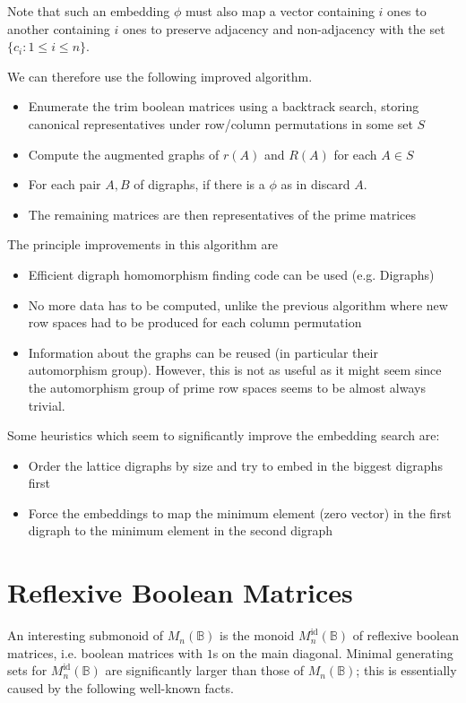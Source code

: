 \documentclass[11pt]{article}
\numberwithin{equation}{section}
\newcommand{\B}{\mathbb{B}}
\newcommand{\Bn}{M_n(\B)}
\newcommand{\Refn}{M_n^{\text{id}}(\B)}
\begin{document}
Note that such an embedding $\phi$ must also map a vector containing $i$ ones to another containing $i$ ones to preserve adjacency and non-adjacency with the set $\{ c_i : 1 \leq i \leq n \}$.

We can therefore use the following improved algorithm.
\begin{itemize}
  \item
    Enumerate the trim boolean matrices using a backtrack search, storing 
    canonical representatives under row/column permutations in some set $S$
  \item 
    Compute the augmented graphs of $r(A)$ and $R(A)$ for each $A \in S$
  \item 
    For each pair $A, B$ of digraphs, if there is a $\phi$ as in  discard $A$.
  \item
    The remaining matrices are then representatives of the prime matrices
\end{itemize}

The principle improvements in this algorithm are
\begin{itemize}
  \item 
    Efficient digraph homomorphism finding code can be used (e.g. Digraphs)
  \item
    No more data has to be computed, unlike the previous algorithm where new row spaces had to be produced for each column permutation
  \item
    Information about the graphs can be reused (in particular their automorphism group). However, this is not as useful as it might seem since the automorphism group of prime row spaces seems to be almost always trivial.
\end{itemize}

Some heuristics which seem to significantly improve the embedding search are:

\begin{itemize}
  \item
    Order the lattice digraphs by size and try to embed in the biggest digraphs
    first
  \item
    Force the embeddings to map the minimum element (zero vector) in the first
    digraph to the minimum element in the second digraph
\end{itemize}

\section{Reflexive Boolean Matrices}
An interesting submonoid of $\Bn$ is the monoid $\Refn$ of reflexive boolean
matrices, i.e. boolean matrices with $1$s on the main diagonal. Minimal
generating sets for $\Refn$ are significantly larger than those of $\Bn$; this
is essentially caused by the following well-known facts.
\end{document}
